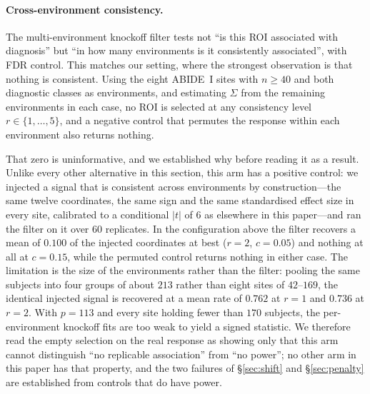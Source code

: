 \documentclass[11pt,a4paper]{article}
\begin{document}
\paragraph{Cross-environment consistency.} The multi-environment knockoff
filter \citep{li2022multienv} tests not ``is this ROI associated with
diagnosis'' but ``in how many environments is it consistently associated'',
with FDR control. This matches our setting, where the strongest observation
is that nothing is consistent. Using the eight ABIDE~I sites with $n\ge40$
and both diagnostic classes as environments, and estimating $\Sigma$ from
the remaining environments in each case, no ROI is selected at any
consistency level $r\in\{1,\dots,5\}$, and a negative control that permutes
the response within each environment also returns nothing.

That zero is uninformative, and we established why before reading it as a
result. Unlike every other alternative in this section, this arm has a
positive control: we injected a signal that is consistent across environments
by construction---the same twelve coordinates, the same sign and the same
standardised effect size in every site, calibrated to a conditional $|t|$ of
$6$ as elsewhere in this paper---and ran the filter on it over $60$
replicates. In the configuration above the filter recovers a mean of $0.100$
of the injected coordinates at best ($r=2$, $c=0.05$) and nothing at all at
$c=0.15$, while the permuted control returns nothing in either case. The
limitation is the size of the environments rather than the filter: pooling
the same subjects into four groups of about $213$ rather than eight sites of
$42$--$169$, the identical injected signal is recovered at a mean rate of
$0.762$ at $r=1$ and $0.736$ at $r=2$. With $p=113$ and every site holding
fewer than $170$ subjects, the per-environment knockoff fits are too weak to
yield a signed statistic. We therefore read the empty selection on the real
response as showing only that this arm cannot distinguish ``no replicable
association'' from ``no power''; no other arm in this paper has that
property, and the two failures of \S\ref{sec:shift} and \S\ref{sec:penalty}
are established from controls that do have power.
\end{document}
